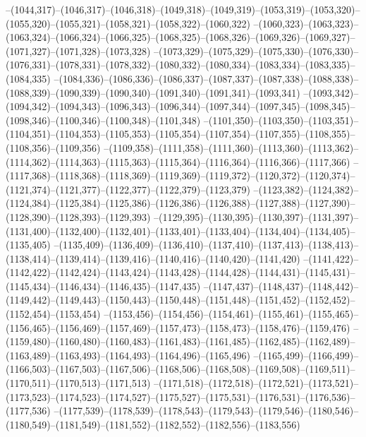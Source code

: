 --(1044,317)--(1046,317)--(1046,318)--(1049,318)--(1049,319)--(1053,319)--(1053,320)--(1055,320)--(1055,321)--(1058,321)--(1058,322)--(1060,322)
--(1060,323)--(1063,323)--(1063,324)--(1066,324)--(1066,325)--(1068,325)--(1068,326)--(1069,326)--(1069,327)--(1071,327)--(1071,328)--(1073,328)
--(1073,329)--(1075,329)--(1075,330)--(1076,330)--(1076,331)--(1078,331)--(1078,332)--(1080,332)--(1080,334)--(1083,334)--(1083,335)--(1084,335)
--(1084,336)--(1086,336)--(1086,337)--(1087,337)--(1087,338)--(1088,338)--(1088,339)--(1090,339)--(1090,340)--(1091,340)--(1091,341)--(1093,341)
--(1093,342)--(1094,342)--(1094,343)--(1096,343)--(1096,344)--(1097,344)--(1097,345)--(1098,345)--(1098,346)--(1100,346)--(1100,348)--(1101,348)
--(1101,350)--(1103,350)--(1103,351)--(1104,351)--(1104,353)--(1105,353)--(1105,354)--(1107,354)--(1107,355)--(1108,355)--(1108,356)--(1109,356)
--(1109,358)--(1111,358)--(1111,360)--(1113,360)--(1113,362)--(1114,362)--(1114,363)--(1115,363)--(1115,364)--(1116,364)--(1116,366)--(1117,366)
--(1117,368)--(1118,368)--(1118,369)--(1119,369)--(1119,372)--(1120,372)--(1120,374)--(1121,374)--(1121,377)--(1122,377)--(1122,379)--(1123,379)
--(1123,382)--(1124,382)--(1124,384)--(1125,384)--(1125,386)--(1126,386)--(1126,388)--(1127,388)--(1127,390)--(1128,390)--(1128,393)--(1129,393)
--(1129,395)--(1130,395)--(1130,397)--(1131,397)--(1131,400)--(1132,400)--(1132,401)--(1133,401)--(1133,404)--(1134,404)--(1134,405)--(1135,405)
--(1135,409)--(1136,409)--(1136,410)--(1137,410)--(1137,413)--(1138,413)--(1138,414)--(1139,414)--(1139,416)--(1140,416)--(1140,420)--(1141,420)
--(1141,422)--(1142,422)--(1142,424)--(1143,424)--(1143,428)--(1144,428)--(1144,431)--(1145,431)--(1145,434)--(1146,434)--(1146,435)--(1147,435)
--(1147,437)--(1148,437)--(1148,442)--(1149,442)--(1149,443)--(1150,443)--(1150,448)--(1151,448)--(1151,452)--(1152,452)--(1152,454)--(1153,454)
--(1153,456)--(1154,456)--(1154,461)--(1155,461)--(1155,465)--(1156,465)--(1156,469)--(1157,469)--(1157,473)--(1158,473)--(1158,476)--(1159,476)
--(1159,480)--(1160,480)--(1160,483)--(1161,483)--(1161,485)--(1162,485)--(1162,489)--(1163,489)--(1163,493)--(1164,493)--(1164,496)--(1165,496)
--(1165,499)--(1166,499)--(1166,503)--(1167,503)--(1167,506)--(1168,506)--(1168,508)--(1169,508)--(1169,511)--(1170,511)--(1170,513)--(1171,513)
--(1171,518)--(1172,518)--(1172,521)--(1173,521)--(1173,523)--(1174,523)--(1174,527)--(1175,527)--(1175,531)--(1176,531)--(1176,536)--(1177,536)
--(1177,539)--(1178,539)--(1178,543)--(1179,543)--(1179,546)--(1180,546)--(1180,549)--(1181,549)--(1181,552)--(1182,552)--(1182,556)--(1183,556)
